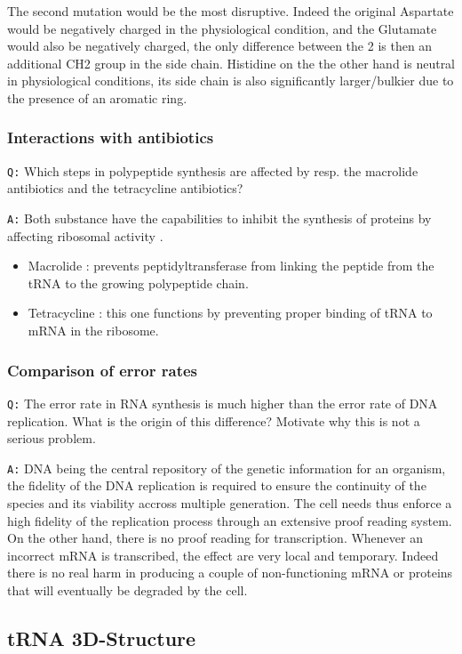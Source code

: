 \documentclass[11pt, a4paper,titlepage]{article}
\begin{document}
The second mutation would be the most disruptive. Indeed the original
Aspartate would be negatively charged in the physiological condition,
and the Glutamate would also be negatively charged, the only
difference between the 2 is then an additional CH2 group in the side
chain. Histidine on the the other hand is neutral in physiological
conditions, its side chain is also significantly larger/bulkier due to
the presence of an aromatic ring.
\subsubsection{Interactions with antibiotics}
\label{sec-1-2-4}

\texttt{Q:} Which steps in polypeptide synthesis are affected by resp. the
macrolide antibiotics and the tetracycline antibiotics?

\texttt{A:} Both substance have the capabilities to inhibit the synthesis of
proteins by affecting ribosomal activity \cite{AntibioticsRibosomeEffect}. 

\begin{itemize}
\item Macrolide : prevents peptidyltransferase from linking the peptide
  from the tRNA to the growing polypeptide chain.
\item Tetracycline : this one functions by preventing proper binding of tRNA
  to mRNA in the ribosome.
\end{itemize}
\subsubsection{Comparison of error rates}
\label{sec-1-2-5}

\texttt{Q:} The error rate in RNA synthesis is much higher than the error rate
of DNA replication. What is the origin of this difference? Motivate
why this is not a serious problem.

\texttt{A:} DNA being the central repository of the genetic information for
an organism, the fidelity of the DNA replication is required to ensure
the continuity of the species and its viability accross multiple
generation. The cell needs thus enforce a high fidelity of the
replication process through an extensive proof reading system. On the
other hand, there is no proof reading for transcription. Whenever an
incorrect mRNA is transcribed, the effect are very local and
temporary. Indeed there is no real harm in producing a couple of
non-functioning mRNA or proteins that will eventually be degraded by
the cell.
\subsection{tRNA 3D-Structure}
\label{sec-1-3}
\end{document}
